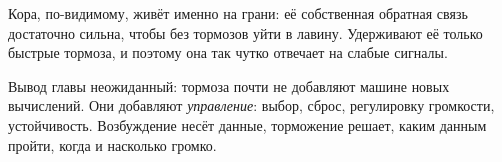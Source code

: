 Кора, по-видимому, живёт именно на грани: её собственная обратная связь достаточно сильна, чтобы без тормозов уйти в лавину. Удерживают её только быстрые тормоза, и поэтому она так чутко отвечает на слабые сигналы.

Вывод главы неожиданный: тормоза почти не добавляют машине новых вычислений. Они добавляют \emph{управление}: выбор, сброс, регулировку громкости, устойчивость. Возбуждение несёт данные, торможение решает, каким данным пройти, когда и насколько громко.

